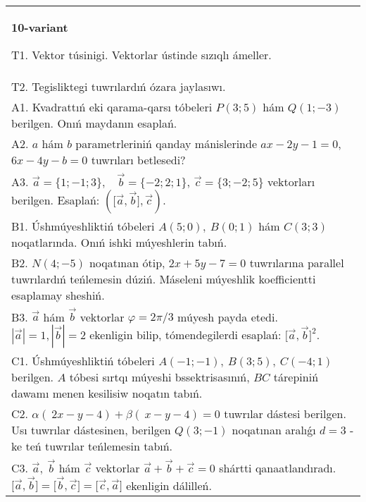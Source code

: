 \documentclass{article}
\begin{document}
\begin{tabular}{m{17cm}}
\textbf{10-variant}
\newline

T1. 
Vektor túsinigi. Vektorlar ústinde sızıqlı ámeller.
 \\
T2. 
Tegisliktegi tuwrılardıń ózara jaylasıwı.
 \\
A1. 
Kvadrattıń eki qarama-qarsı tóbeleri $P(3; 5)$ hám
$Q(1; -3)$ berilgen. Onıń maydanın esaplań.
 \\
A2. 
$a$ hám $b$ parametrleriniń qanday mánislerinde
$ax-2y-1=0$, $6x-4y-b=0$ tuwrıları betlesedi?
 \\
A3. 
$\overrightarrow{a}
= \{ 1; - 1;3\}, \ \ \ \ \overrightarrow{b} = \{ - 2;2;1\}$, $\overrightarrow{c} = \{3; -2;5\}$ vektorları berilgen. Esaplań: 
$(\lbrack\overrightarrow{a},\overrightarrow{b}\rbrack,\overrightarrow{c})$.
 \\
B1. 
Úshmúyeshliktiń tóbeleri \(A(5;0),\ B(0;1)\) hám \(C(3;3)\)
noqatlarında. Onıń ishki múyeshlerin tabıń.
 \\
B2. 
\(N(4;-5)\) noqatınan ótip, $2x+5y-7=0$ 
tuwrılarına parallel tuwrılardıń teńlemesin dúziń. Máseleni múyeshlik
koefficientti esaplamay sheshiń.
 \\
B3. 
$\vec{a}$ hám $\vec{b}$ vektorlar $\varphi = 2\pi/3$ múyesh payda etedi. $|\vec{a}| = 1,|\vec{b}| = 2$ ekenligin bilip, tómendegilerdi esaplań: 
$\lbrack\vec{a},\vec{b}\rbrack^{2}$.
 \\
C1. 
Úshmúyeshliktiń tóbeleri
\(A( - 1; - 1),\ B(3;5),\ C( - 4;1)\) berilgen. $A$ tóbesi sırtqı
múyeshi bssektrisasınıń, $BC$ tárepiniń dawamı menen kesilisiw
noqatın tabıń.
 \\
C2. 
\(\alpha (\ 2x - y - 4) + \beta(\ x - y - 4) = 0\) 
tuwrılar dástesi berilgen. Usı tuwrılar dástesinen, berilgen
\(Q(3; - 1)\) noqatınan aralıǵı \(d = 3\) -ke teń tuwrılar teńlemesin
tabıń.
 \\
C3. 
\(\vec{a},\ \vec{b}\) hám \(\vec{c}\) vektorlar \(\vec{a} + \vec{b} + \vec{c} = 0\) shártti qanaatlandıradı. \(\lbrack\vec{a},\vec{b}\rbrack = \lbrack\vec{b},\vec{c}\rbrack = \lbrack\vec{c},\vec{a}\rbrack\) ekenligin dálilleń.
 \\

\end{tabular}
\vspace{1cm}
\end{document}
